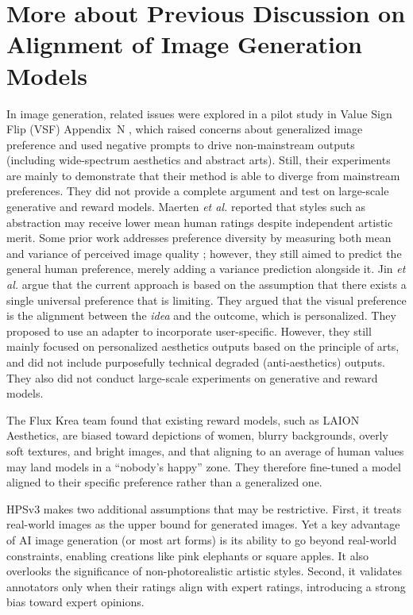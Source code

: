 \section{More about Previous Discussion on Alignment of Image Generation Models}
\label{sec:details_image_alignment}
In image generation, related issues were explored in a pilot study in Value Sign Flip (VSF) Appendix~N \cite{guo_vsf_2025}, which raised concerns about generalized image preference and used negative prompts to drive non-mainstream outputs (including wide-spectrum aesthetics and abstract arts). Still, their experiments are mainly to demonstrate that their method is able to diverge from mainstream preferences. They did not provide a complete argument and test on large-scale generative and reward models. Maerten \textit{et al.} \cite{maerten_lapis_2025} reported that styles such as abstraction may receive lower mean human ratings despite independent artistic merit. Some prior work addresses preference diversity by measuring both mean and variance of perceived image quality \cite{ma_hpsv3_2025, maerten_lapis_2025}; however, they still aimed to predict the general human preference, merely adding a variance prediction alongside it. Jin \textit{et al.}\cite{jin_compose_2025} argue that the current approach is based on the assumption that there exists a single universal preference that is limiting. They argued that the visual preference is the alignment between the \textit{idea} and the outcome, which is personalized. They proposed to use an adapter to incorporate user-specific. However, they still mainly focused on personalized aesthetics outputs based on the principle of arts, and did not include purposefully technical degraded (anti-aesthetics) outputs. They also did not conduct large-scale experiments on generative and reward models.

The Flux Krea team \cite{noauthor_releasing_2025} found that existing reward models, such as LAION Aesthetics, are biased toward depictions of women, blurry backgrounds, overly soft textures, and bright images, and that aligning to an average of human values may land models in a ``nobody’s happy'' zone. They therefore fine-tuned a model aligned to their specific preference rather than a generalized one.

HPSv3 makes two additional assumptions that may be restrictive. First, it treats real-world images as the upper bound for generated images. Yet a key advantage of AI image generation (or most art forms) is its ability to go beyond real-world constraints, enabling creations like pink elephants or square apples. It also overlooks the significance of non-photorealistic artistic styles. Second, it validates annotators only when their ratings align with expert ratings, introducing a strong bias toward expert opinions. 

